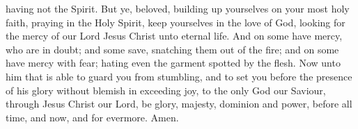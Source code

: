 having not the Spirit. But ye, beloved, building up yourselves on your most holy faith, praying in the Holy Spirit, keep yourselves in the love of God, looking for the mercy of our Lord Jesus Christ unto eternal life. And on some have mercy, who are in doubt; and some save, snatching them out of the fire; and on some have mercy with fear; hating even the garment spotted by the flesh.  Now unto him that is able to guard you from stumbling, and to set you before the presence of his glory without blemish in exceeding joy, to the only God our Saviour, through Jesus Christ our Lord, be glory, majesty, dominion and power, before all time, and now, and for evermore. Amen. 